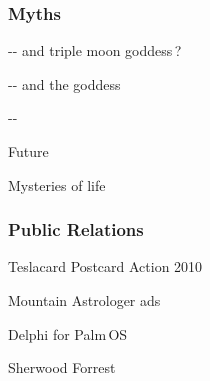 \subsubsection*{Myths}
\begin{list}{}{\setlength{\leftmargin}{13pt}}
\item[\ipdfen] -- and triple moon goddess\,?
\vspace{-1.4mm}
\item[\ipdfen] -- and the\,\,goddess
\vspace{-1.4mm}
\item[\ipdfen] --
\vspace{-1.4mm}
\item[\ipdfen] Future
\vspace{-1.0mm}
\item[\ipdfen] Mysteries of life
\end{list}

\subsubsection*{Public Relations}
\begin{list}{}{\setlength{\leftmargin}{13pt}}
\item[\ipdfen] Teslacard Postcard Action 2010
\vspace{-1.0mm}
\item[\ipdfen] Mountain Astrologer ads
\vspace{-1.4mm}
\item[\ipdfen] Delphi for Palm\,OS
\vspace{-1.4mm}
\item[\ipdfen] Sherwood Forrest
\end{list}

